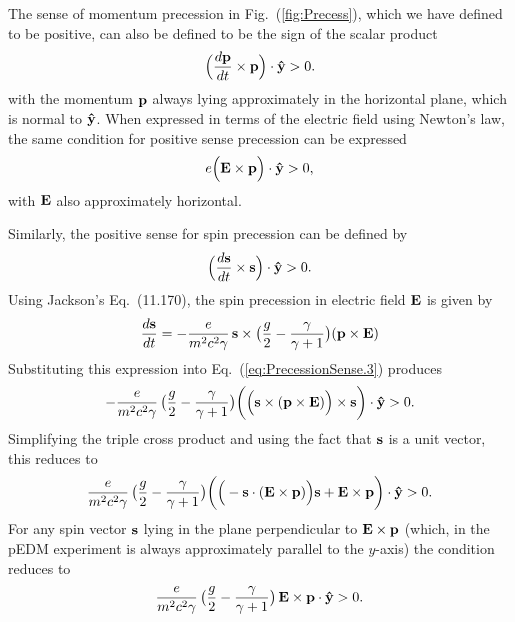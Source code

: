 \documentclass[]{article}
\begin{document}
The sense of momentum precession in Fig.~(\ref{fig:Precess}),
which we have defined to be positive, can also be defined to
be the sign of the scalar product 
%
\begin{equation}
\Big(\frac{d{\bf p}}{dt}\times{\bf p}\Big)\cdot{\bf\hat y} > 0.
\label{eq:PrecessionSense.1}
\end{equation}
%
with the momentum ${\bf p}$ always lying approximately in the 
horizontal plane, which is normal to ${\bf\hat y}$.
When expressed in terms of the electric field using Newton's law,
the same condition for positive sense precession can be expressed  
%
\begin{equation}
e\Big({\bf E}\times{\bf p}\Big)\cdot{\bf\hat y} > 0,
\label{eq:PrecessionSense.2}
\end{equation}
%
with ${\bf E}$ also approximately horizontal. 

Similarly, the positive sense for spin precession can be defined by
%
\begin{equation}
\Big(\frac{d{\bf s}}{dt}\times{\bf s}\Big)\cdot{\bf\hat y} > 0.
\label{eq:PrecessionSense.3}
\end{equation}
%
Using Jackson's Eq.~(11.170), the spin precession in electric
field ${\bf E}$ is given by
%
\begin{equation}
\frac{d{\bf s}}{dt}
 =
-\frac{e}{m^2c^2\gamma}\,
{\bf s}\times
\big(
\frac{g}{2} - \frac{\gamma}{\gamma+1}
\big)
({\bf p}\times{\bf E})
\label{eq:PrecessionSense.4}
\end{equation}
%
Substituting this
expression into Eq.~(\ref{eq:PrecessionSense.3}) produces
%
\begin{equation}
-\frac{e}{m^2c^2\gamma}\,
\big(
\frac{g}{2} - \frac{\gamma}{\gamma+1}
\big)
\bigg(
\Big(
{\bf s}\times
({\bf p}\times{\bf E})
\Big)
\times{\bf s}
\bigg)
\cdot{\bf\hat y} > 0.
\label{eq:PrecessionSense.5}
\end{equation}
%
Simplifying the triple cross product and using the fact
that ${\bf s}$ is a unit vector, this reduces to
%
\begin{equation}
\frac{e}{m^2c^2\gamma}\,
\big(
\frac{g}{2} - \frac{\gamma}{\gamma+1}
\big)
\bigg(
\Big(-{\bf s}\cdot({\bf E}\times{\bf p})\Big){\bf s}
 + {\bf E}\times{\bf p}
\bigg)
\cdot{\bf\hat y} > 0.
\label{eq:PrecessionSense.6}
\end{equation}
%
For any spin vector ${\bf s}$ lying in the plane perpendicular to
${\bf E}\times{\bf p}$ (which, in the pEDM experiment is always
approximately parallel to the $y$-axis) the condition reduces
to 
%
\begin{equation}
\frac{e}{m^2c^2\gamma}\,
\big(
\frac{g}{2} - \frac{\gamma}{\gamma+1}
\big)\,
{\bf E}\times{\bf p}
\cdot{\bf\hat y} > 0.
\label{eq:PrecessionSense.7}
\end{equation}
%
\end{document}
